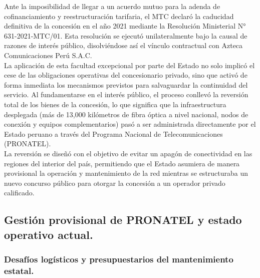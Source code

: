Ante la imposibilidad de llegar a un acuerdo mutuo para la adenda de cofinanciamiento y reestructuración tarifaria, el MTC 
declaró la caducidad definitiva de la concesión en el año 2021 mediante la Resolución Ministerial N° 631-2021-MTC/01. Esta resolución 
se ejecutó unilateralmente bajo la causal de razones de interés público, disolviéndose así el vínculo contractual con Azteca Comunicaciones 
Perú S.A.C.\\
La aplicación de esta facultad excepcional por parte del Estado no solo implicó el cese de las obligaciones operativas del concesionario 
privado, sino que activó de forma inmediata los mecanismos previstos para salvaguardar la continuidad del servicio. Al fundamentarse en el 
interés público, el proceso conllevó la reversión total de los bienes de la concesión, lo que significa que la infraestructura desplegada 
(más de 13,000 kilómetros de fibra óptica a nivel nacional, nodos de conexión y equipos complementarios) pasó a ser administrada directamente 
por el Estado peruano a través del Programa Nacional de Telecomunicaciones (PRONATEL).\\
La reversión se diseñó con el objetivo de evitar un apagón de conectividad en las regiones del interior del país, permitiendo que el Estado 
asumiera de manera provisional la operación y mantenimiento de la red mientras se estructuraba un nuevo concurso público para otorgar la 
concesión a un operador privado calificado.

\subsection{Gestión provisional de PRONATEL y estado operativo actual.}
\subsubsection{Desafíos logísticos y presupuestarios del mantenimiento estatal.}

